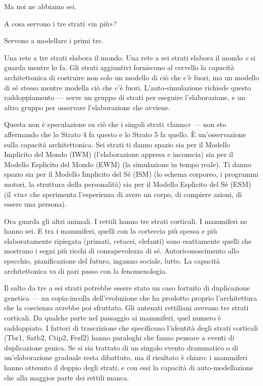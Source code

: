 \documentclass[11pt, twoside, openright]{book}
\begin{document}
Ma noi ne abbiamo sei.

A cosa servono i tre strati «in più»?

Servono a modellare i primi tre.

Una rete a tre strati elabora il mondo. Una rete a sei strati elabora il mondo \textit{e} si guarda mentre lo fa. Gli strati aggiuntivi forniscono al cervello la capacità architettonica di costruire non solo un modello di ciò che c'è fuori, ma un modello di sé stesso mentre modella ciò che c'è fuori. L'auto-simulazione richiede questo raddoppiamento --- serve un gruppo di strati per eseguire l'elaborazione, e un altro gruppo per osservare l'elaborazione che avviene.

Questa non è speculazione su ciò che i singoli strati «fanno» --- non sto affermando che lo Strato 4 fa questo e lo Strato 5 fa quello. È un'osservazione sulla capacità architettonica. Sei strati ti danno spazio sia per il Modello Implicito del Mondo (IWM) (l'elaborazione appresa e inconscia) sia per il Modello Esplicito del Mondo (EWM) (la simulazione in tempo reale). Ti danno spazio sia per il Modello Implicito del Sé (ISM) (lo schema corporeo, i programmi motori, la struttura della personalità) sia per il Modello Esplicito del Sé (ESM) (il «tu» che sperimenta l'esperienza di avere un corpo, di compiere azioni, di essere una persona).

Ora guarda gli altri animali. I rettili hanno tre strati corticali. I mammiferi ne hanno sei. E tra i mammiferi, quelli con la corteccia più spessa e più elaboratamente ripiegata (primati, cetacei, elefanti) sono esattamente quelli che mostrano i segni più ricchi di consapevolezza di sé. Autoriconoscimento allo specchio, pianificazione del futuro, inganno sociale, lutto. La capacità architettonica va di pari passo con la fenomenologia.

Il salto da tre a sei strati potrebbe essere stato un caso fortuito di duplicazione genetica --- un copia-incolla dell'evoluzione che ha prodotto proprio l'architettura che la coscienza avrebbe poi sfruttato. Gli antenati rettiliani avevano tre strati corticali. Da qualche parte nel passaggio ai mammiferi, quel numero è raddoppiato. I fattori di trascrizione che specificano l'identità degli strati corticali (Tbr1, Satb2, Ctip2, Fezf2) hanno paraloghi che fanno pensare a eventi di duplicazione genica. Se si sia trattato di un singolo evento drammatico o di un'elaborazione graduale resta dibattuto, ma il risultato è chiaro: i mammiferi hanno ottenuto il doppio degli strati, e con essi la capacità di auto-modellazione che alla maggior parte dei rettili manca.
\end{document}
